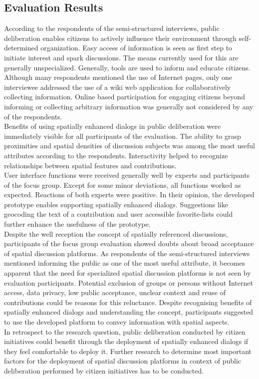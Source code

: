 \subsection{Evaluation Results}
\label{sub:evaluation-results}
According to the respondents of the semi-structured interviews, public deliberation enables citizens to actively influence their environment through self-determined organization. Easy access of information is seen as first step to initiate interest and spark discussions. The means currently used for this are generally unspecialized. Generally, tools are used to inform and educate citizens. Although many respondents mentioned the use of Internet pages, only one interviewee addressed the use of a wiki web application for collaboratively collecting information. Online based participation for engaging citizens beyond informing or collecting arbitrary information was generally not considered by any of the respondents.\\
Benefits of using spatially enhanced dialogs in public deliberation were immediately visible for all participants of the evaluation. The ability to grasp proximities and spatial densities of discussion subjects was among the most useful attributes according to the respondents. Interactivity helped to recognize relationships between spatial features and contributions.\\
User interface functions were received generally well by experts and participants of the focus group. Except for some minor deviations, all functions worked as expected. Reactions of both experts were positive. In their opinion, the developed prototype enables supporting spatially enhanced dialogs. Suggestions like geocoding the text of a contribution and user accessible favorite-lists could further enhance the usefulness of the prototype. \\
Despite the well reception the concept of spatially referenced discussions, participants of the focus group evaluation showed doubts about broad acceptance of spatial discussion platforms. As respondents of the semi-structured interviews mentioned informing the public as one of the most useful attribute, it becomes apparent that the need for specialized spatial discussion platforms is not seen by evaluation participants. Potential exclusion of groups or persons without Internet access, data privacy, low public acceptance, unclear context and reuse of contributions could be reasons for this reluctance. Despite recognising benefits of spatially enhanced dialogs and understanding the concept, participants suggested to use the developed platform to convey information with spatial aspects.\\
In retrospect to the research question, public deliberation conducted by citizen initiatives could benefit through the deployment of spatially enhanced dialogs if they feel comfortable to deploy it. Further research to determine most important factors for the deployment of spatial discussion platforms in context of public deliberation performed by citizen initiatives has to be conducted.


